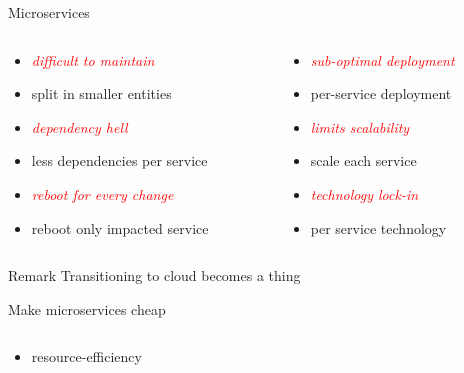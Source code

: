 \documentclass{beamer}
\begin{document}
\begin{frame}{Microservices}
    \begin{columns}
        \begin{column}{0.53\textwidth}
            \begin{itemize}
                \item \emph{\textcolor{red}{difficult to maintain}}
                \item split in smaller entities 
                \item \emph{\textcolor{red}{dependency hell}}
                \item less dependencies per service
                \item \emph{\textcolor{red}{reboot for every change}}
                \item reboot only impacted service
            \end{itemize}
        \end{column}
        \begin{column}{0.5\textwidth}
            \begin{itemize}
                \item \emph{\textcolor{red}{sub-optimal deployment}}
                \item per-service deployment
                \item \emph{\textcolor{red}{limits scalability}}
                \item scale each service
                \item \emph{\textcolor{red}{technology lock-in}}
                \item per service technology
            \end{itemize}
        \end{column}
    \end{columns}
    \vspace{1cm}
    \begin{alertblock}{Remark}
        Transitioning to cloud becomes a thing
    \end{alertblock}
\end{frame}
\begin{frame}{Make microservices cheap}
    \begin{columns}
        \begin{column}{0.36\textwidth}
            \begin{itemize}
                \item resource-efficiency
            \end{itemize}
        \end{column}
        \begin{column}{0.36\textwidth}
        \end{column}
        \begin{column}{0.36\textwidth}
        \end{column}
    \end{columns}
\end{frame}
\end{document}
